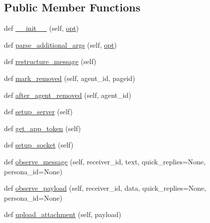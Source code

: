 \subsection*{Public Member Functions}
\begin{DoxyCompactItemize}
\item 
def \hyperlink{classparlai_1_1chat__service_1_1services_1_1messenger_1_1messenger__manager_1_1MessengerManager_a7a9b4068fc428aebd90c38bbe745e45e}{\+\_\+\+\_\+init\+\_\+\+\_\+} (self, \hyperlink{classparlai_1_1chat__service_1_1core_1_1chat__service__manager_1_1ChatServiceManager_a418cecffd5c3e0d6a00919eaa837d0e2}{opt})
\item 
def \hyperlink{classparlai_1_1chat__service_1_1services_1_1messenger_1_1messenger__manager_1_1MessengerManager_ab5419adfecea8ac7f1d5ceda1f15fad9}{parse\+\_\+additional\+\_\+args} (self, \hyperlink{classparlai_1_1chat__service_1_1core_1_1chat__service__manager_1_1ChatServiceManager_a418cecffd5c3e0d6a00919eaa837d0e2}{opt})
\item 
def \hyperlink{classparlai_1_1chat__service_1_1services_1_1messenger_1_1messenger__manager_1_1MessengerManager_aef9d4ef50c80aa22176d992f14da9747}{restructure\+\_\+message} (self)
\item 
def \hyperlink{classparlai_1_1chat__service_1_1services_1_1messenger_1_1messenger__manager_1_1MessengerManager_a305c58cba4b22f99274b81a9253a4ca9}{mark\+\_\+removed} (self, agent\+\_\+id, pageid)
\item 
def \hyperlink{classparlai_1_1chat__service_1_1services_1_1messenger_1_1messenger__manager_1_1MessengerManager_ade5e639c76e2c48815c079d515ecaf9b}{after\+\_\+agent\+\_\+removed} (self, agent\+\_\+id)
\item 
def \hyperlink{classparlai_1_1chat__service_1_1services_1_1messenger_1_1messenger__manager_1_1MessengerManager_adb6559f9e8cca74e2ac94d443f36f9d2}{setup\+\_\+server} (self)
\item 
def \hyperlink{classparlai_1_1chat__service_1_1services_1_1messenger_1_1messenger__manager_1_1MessengerManager_a0fa4fe590efa528624a0965dbb995683}{get\+\_\+app\+\_\+token} (self)
\item 
def \hyperlink{classparlai_1_1chat__service_1_1services_1_1messenger_1_1messenger__manager_1_1MessengerManager_aa3762b7362346cdaaf1d1ad0d6372166}{setup\+\_\+socket} (self)
\item 
def \hyperlink{classparlai_1_1chat__service_1_1services_1_1messenger_1_1messenger__manager_1_1MessengerManager_ab951bfae1eeb05f42e9fa215b2d019a7}{observe\+\_\+message} (self, receiver\+\_\+id, text, quick\+\_\+replies=None, persona\+\_\+id=None)
\item 
def \hyperlink{classparlai_1_1chat__service_1_1services_1_1messenger_1_1messenger__manager_1_1MessengerManager_ad969bb72a7095bde4f48be0a403e9471}{observe\+\_\+payload} (self, receiver\+\_\+id, data, quick\+\_\+replies=None, persona\+\_\+id=None)
\item 
def \hyperlink{classparlai_1_1chat__service_1_1services_1_1messenger_1_1messenger__manager_1_1MessengerManager_a64b1a7241aecdca1d321efa92134ff96}{upload\+\_\+attachment} (self, payload)
\end{DoxyCompactItemize}
